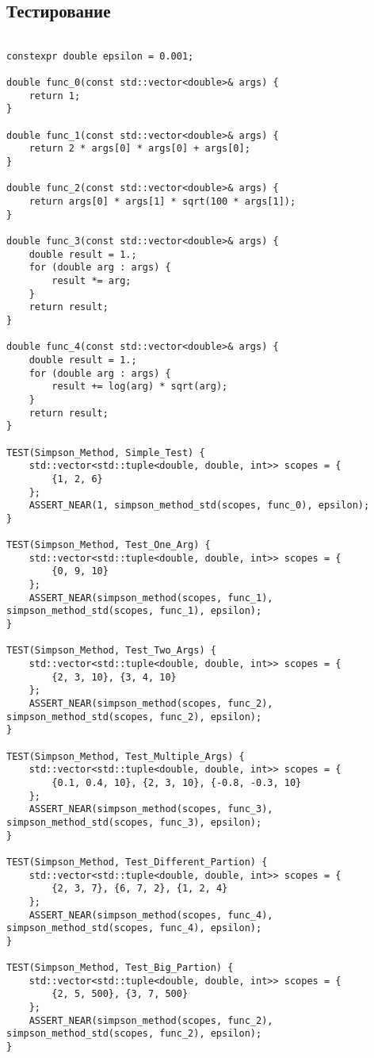 \documentclass[14pt, a4paper]{extarticle}
\begin{document}
\subsection{Тестирование}
\begin{lstlisting}

constexpr double epsilon = 0.001;

double func_0(const std::vector<double>& args) {
    return 1;
}

double func_1(const std::vector<double>& args) {
    return 2 * args[0] * args[0] + args[0];
}

double func_2(const std::vector<double>& args) {
    return args[0] * args[1] * sqrt(100 * args[1]);
}

double func_3(const std::vector<double>& args) {
    double result = 1.;
    for (double arg : args) {
        result *= arg;
    }
    return result;
}

double func_4(const std::vector<double>& args) {
    double result = 1.;
    for (double arg : args) {
        result += log(arg) * sqrt(arg);
    }
    return result;
}

TEST(Simpson_Method, Simple_Test) {
    std::vector<std::tuple<double, double, int>> scopes = {
        {1, 2, 6}
    };
    ASSERT_NEAR(1, simpson_method_std(scopes, func_0), epsilon);
}

TEST(Simpson_Method, Test_One_Arg) {
    std::vector<std::tuple<double, double, int>> scopes = {
        {0, 9, 10}
    };
    ASSERT_NEAR(simpson_method(scopes, func_1), simpson_method_std(scopes, func_1), epsilon);
}

TEST(Simpson_Method, Test_Two_Args) {
    std::vector<std::tuple<double, double, int>> scopes = {
        {2, 3, 10}, {3, 4, 10}
    };
    ASSERT_NEAR(simpson_method(scopes, func_2), simpson_method_std(scopes, func_2), epsilon);
}

TEST(Simpson_Method, Test_Multiple_Args) {
    std::vector<std::tuple<double, double, int>> scopes = {
        {0.1, 0.4, 10}, {2, 3, 10}, {-0.8, -0.3, 10}
    };
    ASSERT_NEAR(simpson_method(scopes, func_3), simpson_method_std(scopes, func_3), epsilon);
}

TEST(Simpson_Method, Test_Different_Partion) {
    std::vector<std::tuple<double, double, int>> scopes = {
        {2, 3, 7}, {6, 7, 2}, {1, 2, 4}
    };
    ASSERT_NEAR(simpson_method(scopes, func_4), simpson_method_std(scopes, func_4), epsilon);
}

TEST(Simpson_Method, Test_Big_Partion) {
    std::vector<std::tuple<double, double, int>> scopes = {
        {2, 5, 500}, {3, 7, 500}
    };
    ASSERT_NEAR(simpson_method(scopes, func_2), simpson_method_std(scopes, func_2), epsilon);
}

\end{lstlisting}
\end{document}
